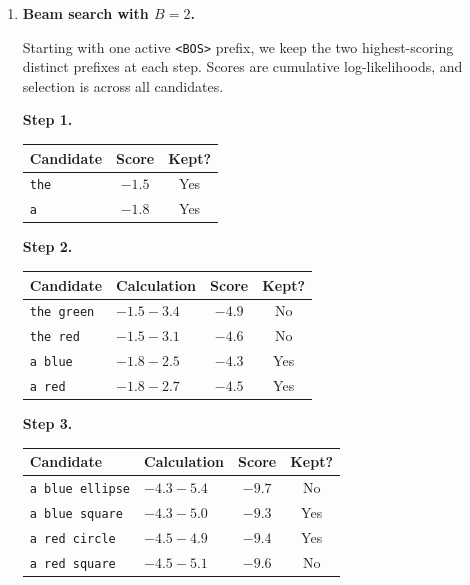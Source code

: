 \documentclass[12pt]{article}
\theoremstyle{definition}
\begin{document}
{\begin{enumerate}[label=\textbf{(\arabic*)}, leftmargin=*]
\begin{enumerate}[label=\textbf{(\alph*)}, leftmargin=*]
        Choosing the largest outgoing log-probability at each step gives
        \[
            \texttt{the} \;\to\; \texttt{red} \;\to\; \texttt{rectangle},
            \qquad \log p=-1.5-3.1-4.5=\boxed{-9.1}.
        \]

        \item \textbf{Beam search with $B=2$.}\nopagebreak[4]

        Starting with one active \texttt{<BOS>} prefix, we keep the two
        highest-scoring distinct prefixes at each step. Scores are cumulative
        log-likelihoods, and selection is across all candidates.

        \textbf{Step 1.}
        \begin{center}
        \begin{tabular}{lcc}
        \toprule
        Candidate & Score & Kept? \\
        \midrule
        \texttt{the} & $-1.5$ & Yes \\
        \texttt{a} & $-1.8$ & Yes \\
        \bottomrule
        \end{tabular}
        \end{center}

        \textbf{Step 2.}
        \begin{center}
        \begin{tabular}{llcc}
        \toprule
        Candidate & Calculation & Score & Kept? \\
        \midrule
        \texttt{the green} & $-1.5-3.4$ & $-4.9$ & No \\
        \texttt{the red} & $-1.5-3.1$ & $-4.6$ & No \\
        \texttt{a blue} & $-1.8-2.5$ & $-4.3$ & Yes \\
        \texttt{a red} & $-1.8-2.7$ & $-4.5$ & Yes \\
        \bottomrule
        \end{tabular}
        \end{center}

        \textbf{Step 3.}
        \begin{center}
        \begin{tabular}{llcc}
        \toprule
        Candidate & Calculation & Score & Kept? \\
        \midrule
        \texttt{a blue ellipse} & $-4.3-5.4$ & $-9.7$ & No \\
        \texttt{a blue square} & $-4.3-5.0$ & $-9.3$ & Yes \\
        \texttt{a red circle} & $-4.5-4.9$ & $-9.4$ & Yes \\
        \texttt{a red square} & $-4.5-5.1$ & $-9.6$ & No \\
        \bottomrule
        \end{tabular}
        \end{center}


\end{enumerate}
\end{enumerate}}
\end{document}
